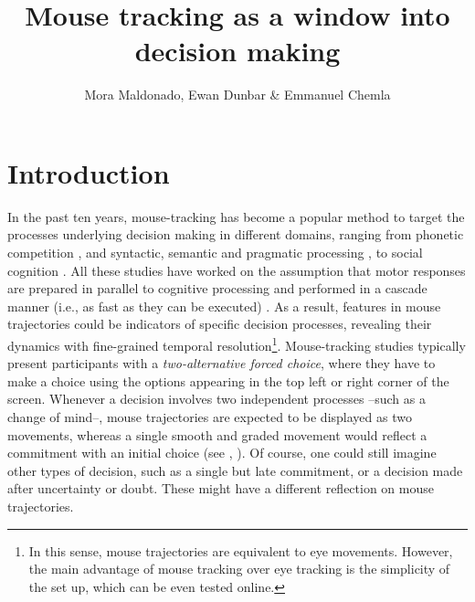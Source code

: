 \documentclass{article}
\title{Mouse tracking as a window into decision making}
\author{Mora Maldonado, Ewan Dunbar \& Emmanuel Chemla}
\begin{document}
\maketitle

\section{Introduction}

In the past ten years, mouse-tracking has become a popular method to target the processes underlying decision making in different domains, ranging from phonetic competition \citep{Spivey2005,cranford2017mouse}, and syntactic, semantic and pragmatic processing \citep[among others]{Farmer2007, Dale2011, tomlinson2013possibly,xiao2014semantic,sauerland2015tracking,xiao2017role}, to social cognition \citep{Freeman2010,Freeman2011,freeman2016more}.
%
All these studies have worked on the assumption that motor responses are prepared in parallel to cognitive processing and performed in a cascade manner (i.e., as fast as they can be executed) \citep{song2006role,Song2009,Freeman2010,spivey2006continuous,Hehman2014}.
%
As a result, features in mouse trajectories could be indicators of specific decision processes, revealing their dynamics with fine-grained temporal resolution\footnote{In this sense, mouse trajectories are equivalent to eye movements. However, the main advantage of mouse tracking over eye tracking is the simplicity of the set up, which can be even tested online.}. 
%
Mouse-tracking studies typically present participants with a \emph{two-alternative forced choice}, where they have to make a choice using the options appearing in the top left or right corner of the screen. Whenever a decision involves two independent processes --such as a change of mind--, mouse trajectories are expected to be displayed as two movements, whereas a single smooth and graded movement would reflect a commitment with an initial choice (see , \citealp{Wojnowicz2009}).
%
Of course, one could still imagine other types of decision, such as a single but late commitment, or a decision made after uncertainty or doubt. These might have a different reflection on mouse trajectories.
\end{document}
